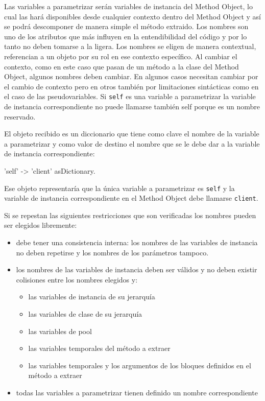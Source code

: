 Las variables a parametrizar serán variables de instancia del Method Object, lo cual las hará
disponibles desde cualquier contexto dentro del Method Object y así se podrá descomponer de manera
simple el método extraido. Los nombres son uno de los atributos que más influyen en la
entendibilidad del código y por lo tanto no deben tomarse a la ligera. Los nombres se eligen de
manera contextual, referencian a un objeto por su rol en ese contexto específico. Al cambiar el
contexto, como en este caso que pasan de un método a la clase del Method Object, algunos nombres
deben cambiar. En algunos casos necesitan cambiar por el cambio de contexto pero en otros también
por limitaciones sintácticas como en el caso de las pseudovariables. Si \lstinline{self} es una
variable a parametrizar la variable de instancia correspondiente no puede llamarse también self
porque es un nombre reservado. 

El objeto recibido es un diccionario que tiene como clave el nombre de la variable a parametrizar y
como valor de destino el nombre que se le debe dar a la variable de instancia correspondiente:

\begin{code}
    {
        'self' -> 'client'
    } asDictionary.
\end{code}

Ese objeto representaría que la única variable a parametrizar es \lstinline{self} y la variable de
instancia correspondiente en el Method Object debe llamarse \lstinline{client}.

Si se repestan las siguientes restricciones que son verificadas los nombres pueden ser elegidos
libremente:

\begin{itemize}
    \item debe tener una consistencia interna: los nombres de las variables de instancia no deben repetirse
    y los nombres de los parámetros tampoco.
    \item los nombres de las variables de instancia deben ser válidos y no deben existir colisiones entre
    los nombres elegidos y:
    \begin{itemize}
        \item las variables de instancia de su jerarquía
        \item las variables de clase de su jerarquía
        \item las variables de pool
        \item las variables temporales del método a extraer
        \item las variables temporales y los argumentos de los bloques definidos en el método a extraer
    \end{itemize}
    \item todas las variables a parametrizar tienen definido un nombre correspondiente
\end{itemize}




